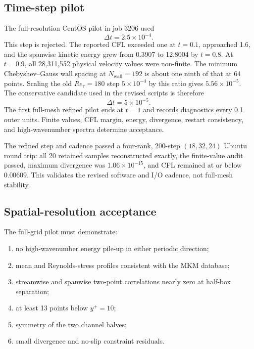 \documentclass[11pt]{article}
\begin{document}
\subsection{Time-step pilot}

The full-resolution CentOS pilot in job 3206 used
\begin{equation}
  \Delta t=2.5\times10^{-4}.
  \label{eq:initial_dt}
\end{equation}
This step is rejected.  The reported CFL exceeded one at $t=0.1$, approached
1.6, and the spanwise kinetic energy grew from 0.3907 to 12.8004 by $t=0.8$.
At $t=0.9$, all 28,311,552 physical velocity values were non-finite.  The
minimum Chebyshev--Gauss wall spacing at $N_{\mathrm{wall}}=192$ is about one
ninth of that at 64 points.  Scaling the old $Re_{\tau}=180$ step
$5\times10^{-4}$ by this ratio gives $5.56\times10^{-5}$.  The conservative
candidate used in the revised scripts is therefore
\begin{equation}
  \boxed{\Delta t=5\times10^{-5}}.
  \label{eq:refined_dt}
\end{equation}
The first full-mesh refined pilot ends at $t=1$ and records diagnostics every
0.1 outer units.  Finite values, CFL margin, energy, divergence, restart
consistency, and high-wavenumber spectra determine acceptance.

The refined step and cadence passed a four-rank, 200-step
$(18,32,24)$ Ubuntu round trip: all 20 retained samples reconstructed exactly,
the finite-value audit passed, maximum divergence was
$1.06\times10^{-15}$, and CFL remained at or below 0.00609.  This validates
the revised software and I/O cadence, not full-mesh stability.

\subsection{Spatial-resolution acceptance}

The full-grid pilot must demonstrate:
\begin{enumerate}
  \item no high-wavenumber energy pile-up in either periodic direction;
  \item mean and Reynolds-stress profiles consistent with the MKM database;
  \item streamwise and spanwise two-point correlations nearly zero at
        half-box separation;
  \item at least 13 points below $y^+=10$;
  \item symmetry of the two channel halves;
  \item small divergence and no-slip constraint residuals.
\end{enumerate}
\end{document}
